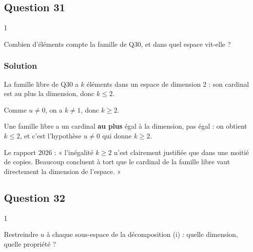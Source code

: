 \documentclass[11pt,a4paper]{article}
\newcommand{\equationajustee}[1]{%
  \sbox{\boiteequation}{$\displaystyle #1$}%
  \ifdim\wd\boiteequation>\linewidth
    \[\resizebox{\linewidth}{!}{\usebox{\boiteequation}}\]%
  \else
    \[#1\]%
  \fi}
\begin{document}
\hypertarget{question-31}{%
\subsection{Question 31}\label{question-31}}

\begin{indication}{1}

Combien d'éléments compte la famille de Q30, et dans quel espace vit-elle ?

\end{indication}

\hypertarget{solution-30}{%
\subsubsection{Solution}\label{solution-30}}

La famille libre de Q30 a \(k\) éléments dans un espace de dimension \(2\) : son cardinal est au plus la dimension, donc \(k\le2\).

Comme \(u\neq0\), on a \(k\ne1\), donc \(k\ge2\).

\equationajustee{\boxed{k=2\ \text{ et }\ u^2=0,\ \text{ donc }\ u\in\mathcal N_2.}}

\begin{piege}

Une famille libre a un cardinal \textbf{au plus} égal à la dimension, pas égal : on obtient \(k\le2\), et c'est l'hypothèse \(u\neq0\) qui donne \(k\ge2\).

\end{piege}

\begin{jury}

Le rapport 2026 : « l'inégalité \(k\ge2\) n'est clairement justifiée que dans une moitié de copies. Beaucoup concluent à tort que le cardinal de la famille libre vaut directement la dimension de l'espace. »

\end{jury}

\hypertarget{question-32}{%
\subsection{Question 32}\label{question-32}}

\begin{indication}{1}

Restreindre \(u\) à chaque sous-espace de la décomposition (i) : quelle dimension, quelle propriété ?

\end{indication}
\end{document}
